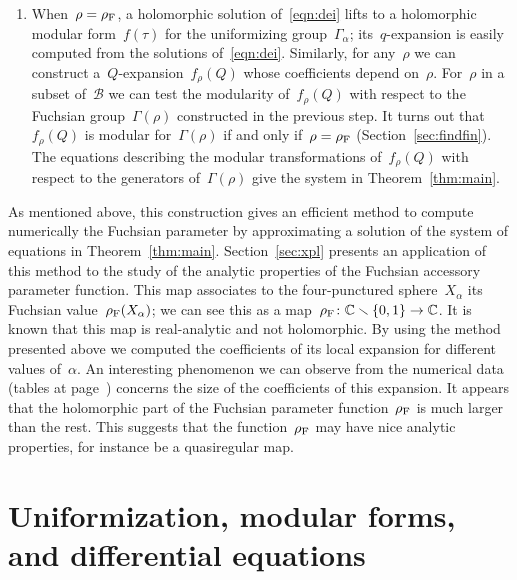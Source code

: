 \documentclass[pdftex]{sigma}
\newcommand{\C}{\mathbb{C}}
\numberwithin{equation}{section}
\begin{document}
\begin{enumerate}
\item When~$\rho=\rho_{\rm F}$, a holomorphic solution of~\eqref{eqn:dei} lifts to a holomorphic modular form~$f(\tau)$ for the uniformizing group~$\Gamma_\alpha$; its~$q$-expansion is easily computed from the solutions of~\eqref{eqn:dei}. Similarly, for any~$\rho$ we can construct a~$Q$-expansion~$f_\rho(Q)$ whose coefficients depend on~$\rho$. For~$\rho$ in a subset of~$\mathcal{B}$ we can test the modularity of~$f_\rho(Q)$ with respect to the Fuchsian group~$\Gamma(\rho)$ constructed in the previous step. It turns out that~$f_\rho(Q)$ is modular for~$\Gamma(\rho)$ if and only if~$\rho=\rho_{\rm F}$ (Section~\ref{sec:findfin}). The equations describing the modular transformations of~$f_\rho(Q)$ with respect to the generators of~$\Gamma(\rho)$ give the system in Theorem~\ref{thm:main}.
\end{enumerate}

As mentioned above, this construction gives an efficient method to compute numerically the Fuchsian parameter by approximating a solution of the system of equations in Theorem~\ref{thm:main}. Section~\ref{sec:xpl} presents an application of this method to the study of the analytic properties of the Fuchsian accessory parameter function. This map associates to the four-punctured sphere~$X_\alpha$ its Fuchsian value~$\rho_{\rm F}(X_\alpha)$; we can see this as a map~$\rho_{\rm F}\colon\C\smallsetminus\{0,1\}\to\C$. It is known that this map is real-analytic and not holomorphic. By using the method presented above we computed the coefficients of its local expansion for different values of~$\alpha$. An interesting phenomenon we can observe from the numerical data (tables at page~\pageref{table1}) concerns the size of the coefficients of this expansion. It appears that the holomorphic part of the Fuchsian parameter function~$\rho_{\rm F}$ is much larger than the rest. This suggests that the function~$\rho_{\rm F}$ may have nice analytic properties, for instance be a quasiregular map.

\section{Uniformization, modular forms, and differential equations}\label{sec:pre}
\end{document}
